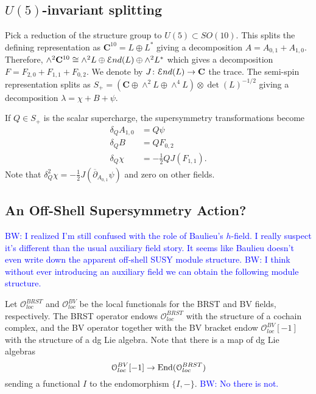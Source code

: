 \documentclass[10pt, oneside]{article}
\newcommand{\C}{\mathbf{C}}
\newcommand{\brian}[1]{\textcolor{blue}{BW: #1}}
\begin{document}
\subsection{$U(5)$-invariant splitting}

Pick a reduction of the structure group to $U(5)\subset SO(10)$. This splits the defining representation as $\C^{10} = L\oplus L^*$ giving a decomposition $A = A_{0, 1} + A_{1, 0}$. Therefore, $\wedge^2 \C^{10} \cong \wedge^2 L \oplus \End(L) \oplus \wedge^2 L^*$ which gives a decomposition $F = F_{2, 0} + F_{1, 1} + F_{0, 2}$. We denote by $J\colon \End(L)\rightarrow \C$ the trace. The semi-spin representation splits as $S_+ = (\C\oplus \wedge^2 L\oplus \wedge^4 L)\otimes \det(L)^{-1/2}$ giving a decomposition $\lambda = \chi + B + \psi$.

If $Q\in S_+$ is the scalar supercharge, the supersymmetry transformations become
\begin{align*}
\delta_Q A_{1, 0} &= Q\psi \\
\delta_Q B &= Q F_{0, 2} \\
\delta_Q \chi &= -\frac{1}{2}Q J(F_{1, 1}).
\end{align*}
Note that $\delta_Q^2 \chi = -\frac{1}{2} J(\overline{\partial}_{A_{0, 1}} \psi)$ and zero on other fields.




\subsection{An Off-Shell Supersymmetry Action?}
\brian{I realized I'm still confused with the role of Baulieu's $h$-field. 
I really suspect it's different than the usual auxiliary field story. 
It seems like Baulieu doesn't even write down the apparent off-shell SUSY module structure. 
}
\brian{I think without ever introducing an auxiliary field we can obtain the following module structure.}

\def\oloc{\mathcal{O}_{loc}}

Let $\oloc^{BRST}$ and $\oloc^{BV}$ be the local functionals for the BRST and BV fields, respectively. 
The BRST operator endows $\oloc^{BRST}$ with the structure of a cochain complex, and the BV operator together with the BV bracket endow $\oloc^{BV}[-1]$ with the structure of a dg Lie algebra. 
Note that there is a map of dg Lie algebras
\[
\oloc^{BV}[-1] \to {\rm End}(\oloc^{BRST})
\]
sending a functional $I$ to the endomorphism $\{I,-\}$.
\brian{No there is not.}
\end{document}
